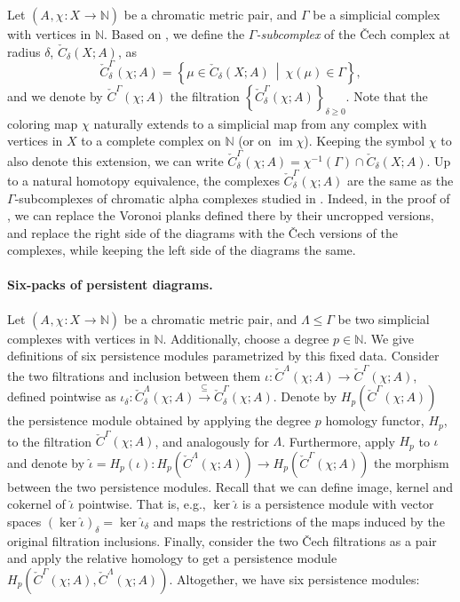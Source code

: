 \documentclass[8pt,a4paper,oneside,english,english]{article}
\theoremstyle{plain}
\theoremstyle
{plain}
\theoremstyle{definition}
\newcommand{\N}{\mathbb{N}}
\newcommand{\extMP}[1]{(A_{#1},\chi_{#1}\colon X_{#1}\to\N)}
\DeclareMathOperator{\im}{im}
\begin{document}
Let $\extMP{}$ be a chromatic metric pair, and $\Gamma$ be a simplicial complex with vertices in $\N$. 
Based on \cite[Section~3.4]{CulDraEdeSag1}, we define the \emph{$\Gamma$-subcomplex} of the \v{C}ech complex at radius $\delta$, $\check{C}_\delta(X;A)$, as 
\[
\check{C}_\delta^\Gamma(\chi; A) = \left\{ \mu\in\check{C}_\delta(X;A) \ \middle|\ \chi(\mu)\in\Gamma \right\},
\]
and we denote by $\check{C}^\Gamma(\chi; A)$ the filtration $\left\{ \check{C}_\delta^\Gamma(\chi; A) \right\}_{\delta\geq0}$. 
Note that the coloring map $\chi$ naturally extends to a simplicial map from any complex with vertices in $X$ to a complete complex on $\N$ (or on $\im\chi$). Keeping the symbol $\chi$ to also denote this extension, we can write $\check{C}_\delta^\Gamma(\chi; A) = \chi^{-1}(\Gamma) \cap \check{C}_\delta(X;A)$.
Up to a natural homotopy equivalence, the complexes $\check{C}_\delta^\Gamma(\chi; A)$ are the same as the $\Gamma$-subcomplexes of chromatic alpha complexes studied in \cite{CulDraEdeSag1}. Indeed, in the proof of \cite[Theorem~3.8]{CulDraEdeSag1}, we can replace the Voronoi planks defined there by their uncropped versions, and replace the right side of the diagrams with the \v{C}ech versions of the complexes, while keeping the left side of the diagrams the same.

\paragraph{Six-packs of persistent diagrams.} Let $\extMP{}$ be a chromatic metric pair, and $\Lambda\leq\Gamma$ be two simplicial complexes with vertices in $\N$. Additionally, choose a degree $p\in\N$. We give definitions of six persistence modules parametrized by this fixed data. Consider the two filtrations and inclusion between them $\iota: \check{C}^\Lambda(\chi; A) \xrightarrow{} \check{C}^\Gamma(\chi; A)$, defined pointwise as $\iota_\delta: \check{C}_\delta^\Lambda(\chi; A) \xrightarrow{\subseteq} \check{C}_\delta^\Gamma(\chi; A)$. Denote by $H_p(\check{C}^\Gamma(\chi; A))$ the persistence module obtained by applying the degree $p$ homology functor, $H_p$, to the filtration $\check{C}^\Gamma(\chi; A)$, and analogously for $\Lambda$. Furthermore, apply $H_p$ to $\iota$ and denote by $\hat\iota=H_p(\iota):H_p(\check{C}^\Lambda(\chi; A))\rightarrow H_p(\check{C}^\Gamma(\chi; A))$ the morphism between the two persistence modules. Recall that we can define image, kernel and cokernel of $\hat\iota$ pointwise. That is, e.g., $\ker\hat\iota$ is a persistence module with vector spaces $(\ker\hat\iota)_\delta = \ker\hat\iota_\delta$ and maps the restrictions of the maps induced by the original filtration inclusions. Finally, consider the two \v{C}ech filtrations as a pair and apply the relative homology to get a persistence module $H_p(\check{C}^\Gamma(\chi; A), \check{C}^\Lambda(\chi; A))$. Altogether, we have six persistence modules:
\end{document}

